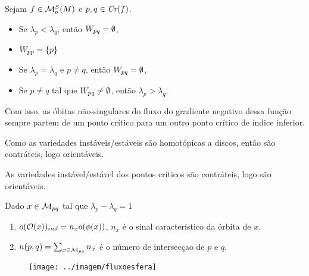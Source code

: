 \documentclass{beamer}
\begin{document}
	\begin{frame}
		\begin{proposicao}
			Sejam $f \in \mathcal{M}^{S}_{o}(M)$ e $p,q \in \textit{Cr}(f)$.
			\begin{itemize}
				\item Se $\lambda_{p}<\lambda_{q}$, então $W_{pq} = \emptyset$,
				
				\item $W_{pp} = \{p\}$
				
				\item Se $\lambda_{p} = \lambda_{q}$ e $p\neq q$, então $W_{pq} = \emptyset$,
				
				\item Se $p \neq q$ tal que $W_{pq} \neq \emptyset$, então $\lambda_{p}>\lambda_{q}$.
			\end{itemize}
		\end{proposicao}
		
		Com isso, as óbitas não-singulares do fluxo do gradiente negativo dessa função sempre partem de um ponto crítico para um outro ponto crítico de índice inferior.

		\begin{tiny}
			Como as variedades instáveis/estáveis são homotópicas a discos, então são contráteis, logo orientáveis.
		\end{tiny}		
	\end{frame}
	
	\begin{frame}
		
		As variedades instável/estável dos pontos críticos são contráteis, logo são orientáveis.
		
		\begin{definicao}
			Dado $x \in \mathcal{M}_{pq}$ tal que $\lambda_{p}-\lambda_{q} = 1$
			
			\begin{enumerate}
				\item $o(\mathcal{O}(x))_{ind} = n_{x}o(\phi(x))$, $n_{x}$ é o sinal característico da órbita de $x$.
				
				\item $n(p,q) = \sum_{x \in \mathcal{M}_{pq} }n_{x}$ é o número de intersecçao de $p$ e $q$.
			\end{enumerate}
			
		\end{definicao}
		\begin{figure}
			\centering
			\textbf{}\par
			\texttt{[image: ../imagem/fluxoesfera]}
		\end{figure}
	\end{frame}
	
\end{document}
